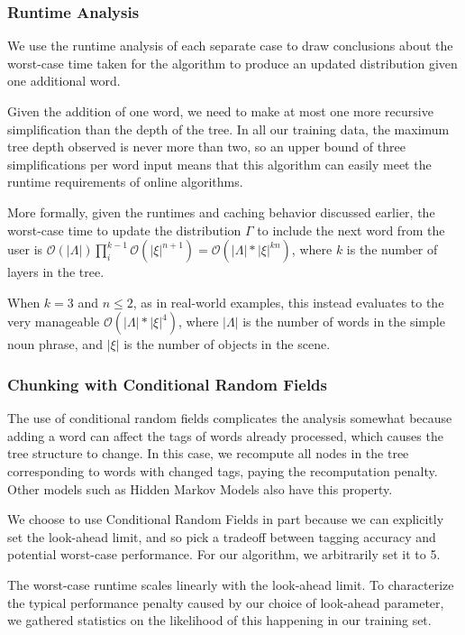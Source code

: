 \documentclass[conference]{IEEEtran}
\numberwithin{equation}{section}
\begin{document}
\subsubsection{Runtime Analysis}

We use the runtime analysis of each separate case to draw conclusions about the worst-case time taken for the algorithm to produce an updated distribution given one additional word.

Given the addition of one word, we need to make at most one more recursive simplification than the depth of the tree. In all our training data, the maximum tree depth observed is never more than two, so an upper bound of three simplifications per word input means that this algorithm can easily meet the runtime requirements of online algorithms.

More formally, given the runtimes and caching behavior discussed earlier, the worst-case time to update the distribution $\Gamma$ to include the next word from the user is $\mathcal{O}(|\Lambda|) \prod_i^{k-1} \mathcal{O}(|\xi|^{n+1}) = \mathcal{O}(|\Lambda| * |\xi|^{kn})$, where $k$ is the number of layers in the tree.

When $k = 3$ and $n \leq 2$, as in real-world examples, this instead evaluates to the very manageable $\mathcal{O}(|\Lambda| * |\xi|^{4})$, where $|\Lambda|$ is the number of words in the simple noun phrase, and $|\xi|$ is the number of objects in the scene.

\subsubsection{Chunking with Conditional Random Fields}

The use of conditional random fields complicates the analysis somewhat because adding a word can affect the tags of words already processed, which causes the tree structure to change. In this case, we recompute all nodes in the tree corresponding to words with changed tags, paying the recomputation penalty. Other models such as Hidden Markov Models also have this property.

We choose to use Conditional Random Fields in part because we can explicitly set the look-ahead limit, and so pick a tradeoff between tagging accuracy and potential worst-case performance. For our algorithm, we arbitrarily set it to 5.

The worst-case runtime scales linearly with the look-ahead limit. To characterize the typical performance penalty caused by our choice of look-ahead parameter, we gathered statistics on the likelihood of this happening in our training set.
\end{document}

